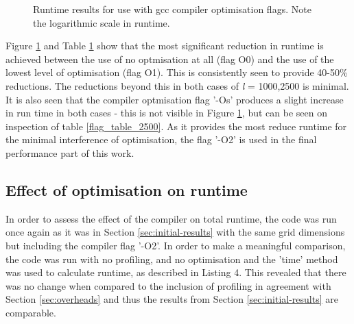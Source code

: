 \documentclass[12pt,a4paper]{article}
\begin{document}
\begin{figure}[h]
\begin{center}
\caption{Runtime results for use with gcc compiler optimisation flags. Note the logarithmic scale in  runtime.}
\label{fig:fig_gcc_flags}
\end{center}
\end{figure}

Figure \ref{fig:fig_gcc_flags} and Table \ref{fig:fig_gcc_flags} show that the most significant reduction in runtime is achieved between the use of no optmisation at all (flag O0) and the use of the lowest level of optimisation (flag O1). This is consistently seen to provide 40-50\% reductions. The reductions beyond this in both cases of {\em l} = 1000,2500 is minimal. It is also seen that the compiler optmisation flag '-Os' produces a slight increase in run time in both cases - this is not visible in Figure \ref{fig:fig_gcc_flags}, but can be seen on inspection of table \ref{flag_table_2500}. As it provides the most reduce runtime for the minimal interference of optimisation, the flag '-O2' is used in the final performance part of this work.

\subsection{Effect of optimisation on runtime}\label{sec:enhancements_by_o2}

In order to assess the effect of the compiler on total runtime, the code was run once again as it was in Section \ref{sec:initial-results} with the same grid dimensions but including the compiler flag '-O2'. In order to make a meaningful comparison, the code was run with no profiling, and no optimisation and the 'time' method was used to calculate runtime, as described in Listing 4. This revealed that there was no change when compared to the inclusion of profiling in agreement with Section \ref{sec:overheads} and thus the results from Section \ref{sec:initial-results} are comparable. 
\end{document}
